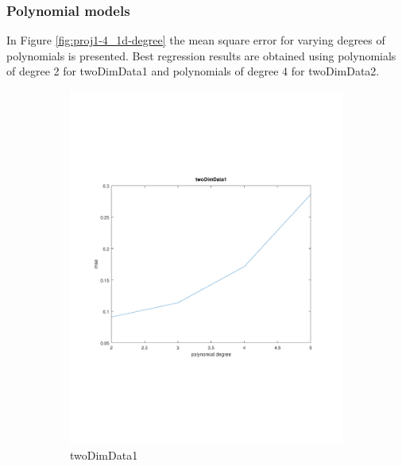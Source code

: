 \documentclass[]{article}
\begin{document}
\subsubsection{Polynomial models}
In Figure \ref{fig:proj1-4_1d-degree} the mean square error for varying degrees of polynomials is presented. Best regression results are obtained using polynomials of degree 2 for twoDimData1 and polynomials of degree 4 for twoDimData2.

\begin{figure}[ht]
\centering
\begin{subfigure}{.49\textwidth}
	\centering
	\includegraphics[trim= 10cm 5cm 10cm 5cm, scale=0.4]{proj1-4_1d-degree-data1}
	\caption{twoDimData1}
	\label{proj1-4_1d-degree-data1}
\end{subfigure}
\begin{subfigure}{.49\textwidth}
	\centering

\end{subfigure}
\end{figure}
\end{document}
